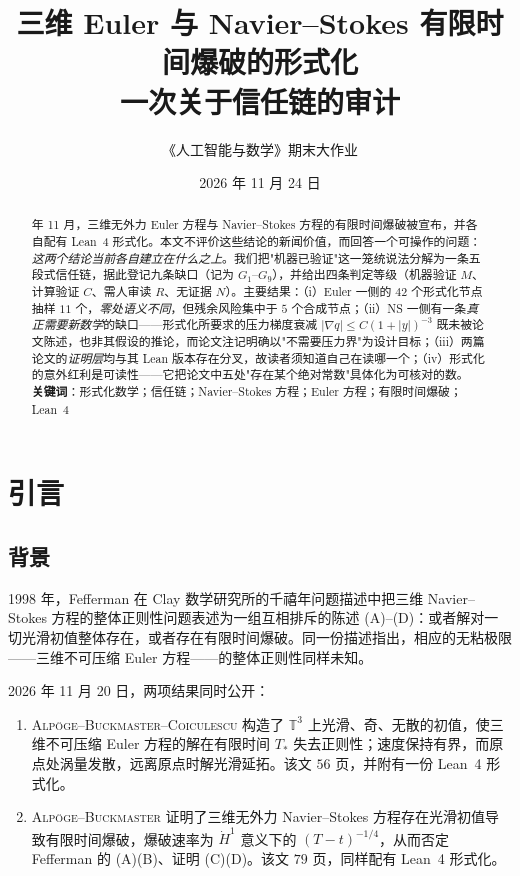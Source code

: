 \documentclass[11pt,a4paper]{ctexart}
\title{\bfseries 三维 Euler 与 Navier--Stokes 有限时间爆破的形式化\\[2pt]
\large 一次关于信任链的审计}
\author{《人工智能与数学》期末大作业}
\date{2026 年 11 月 24 日}
\theoremstyle{definition}
\newcommand{\T}{\mathbb{T}}
\newcommand{\abs}[1]{\left\lvert #1\right\rvert}
\begin{document}
\maketitle

\begin{abstract}
 年 11 月，三维无外力 Euler 方程与 Navier--Stokes 方程的有限时间爆破被宣布，并各自配有 Lean~4 形式化。本文不评价这些结论的新闻价值，而回答一个可操作的问题：\emph{这两个结论当前各自建立在什么之上}。我们把"机器已验证"这一笼统说法分解为一条五段式信任链，据此登记九条缺口（记为 $G_1$--$G_9$），并给出四条判定等级（机器验证 $M$、计算验证 $C$、需人审读 $R$、无证据 $N$）。主要结果：（i）Euler 一侧的 $42$ 个形式化节点抽样 $11$ 个，\emph{零处语义不同}，但残余风险集中于 $5$ 个合成节点；（ii）NS 一侧有一条\emph{真正需要新数学}的缺口——形式化所要求的压力梯度衰减 $\abs{\nabla q}\le C(1+\abs{y})^{-3}$ 既未被论文陈述，也非其假设的推论，而论文注记明确以"不需要压力界"为设计目标；（iii）两篇论文的\emph{证明层}均与其 Lean 版本存在分叉，故读者须知道自己在读哪一个；（iv）形式化的意外红利是可读性——它把论文中五处"存在某个绝对常数"具体化为可核对的数。\\
\textbf{关键词}：形式化数学；信任链；Navier--Stokes 方程；Euler 方程；有限时间爆破；Lean~4
\end{abstract}

\tableofcontents
\medskip

\section{引言}

\subsection{背景}

1998 年，Fefferman 在 Clay 数学研究所的千禧年问题描述中把三维 Navier--Stokes 方程的整体正则性问题表述为一组互相排斥的陈述 (A)--(D)：或者解对一切光滑初值整体存在，或者存在有限时间爆破。同一份描述指出，相应的无粘极限——三维不可压缩 Euler 方程——的整体正则性同样未知。

2026 年 11 月 20 日，两项结果同时公开：

\begin{enumerate}[label=(\roman*)]
\item \textsc{Alp\"oge--Buckmaster--Coiculescu} 构造了 $\T^3$ 上光滑、奇、无散的初值，使三维不可压缩 Euler 方程的解在有限时间 $T_*$ 失去正则性；速度保持有界，而原点处涡量发散，远离原点时解光滑延拓。该文 $56$ 页，并附有一份 Lean~4 形式化。
\item \textsc{Alp\"oge--Buckmaster} 证明了三维无外力 Navier--Stokes 方程存在光滑初值导致有限时间爆破，爆破速率为 $\dot H^1$ 意义下的 $(T-t)^{-1/4}$，从而否定 Fefferman 的 (A)(B)、证明 (C)(D)。该文 $79$ 页，同样配有 Lean~4 形式化。
\end{enumerate}
\end{document}
